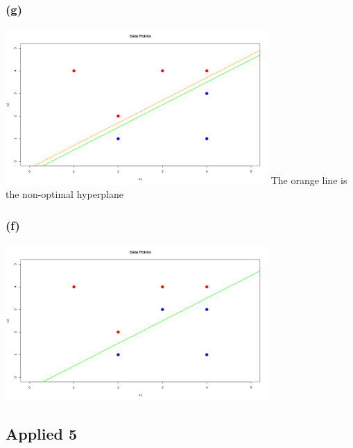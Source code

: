 \documentclass{article}
\begin{document}
\subsubsection*{(g)}
\includegraphics[width=0.75\textwidth]{figs/q3-2.png}
\newline
The orange line is the non-optimal hyperplane
\subsubsection*{(f)}
\includegraphics[width=0.75\textwidth]{figs/q3-3.png}

\newpage
\subsection{Applied 5}
\end{document}
